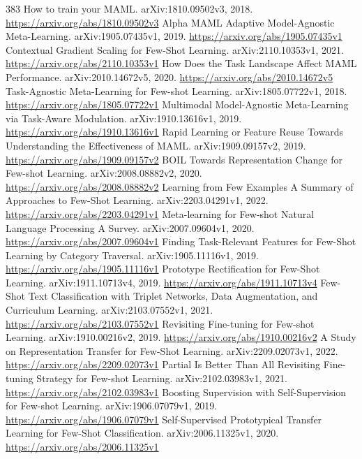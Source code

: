 \documentclass[11pt]{article}
\begin{document}
\begin{thebibliography}{383}
 How to train your MAML. arXiv:1810.09502v3, 2018. \url{https://arxiv.org/abs/1810.09502v3}
 Alpha MAML Adaptive Model-Agnostic Meta-Learning. arXiv:1905.07435v1, 2019. \url{https://arxiv.org/abs/1905.07435v1}
 Contextual Gradient Scaling for Few-Shot Learning. arXiv:2110.10353v1, 2021. \url{https://arxiv.org/abs/2110.10353v1}
 How Does the Task Landscape Affect MAML Performance. arXiv:2010.14672v5, 2020. \url{https://arxiv.org/abs/2010.14672v5}
 Task-Agnostic Meta-Learning for Few-shot Learning. arXiv:1805.07722v1, 2018. \url{https://arxiv.org/abs/1805.07722v1}
 Multimodal Model-Agnostic Meta-Learning via Task-Aware Modulation. arXiv:1910.13616v1, 2019. \url{https://arxiv.org/abs/1910.13616v1}
 Rapid Learning or Feature Reuse Towards Understanding the Effectiveness of MAML. arXiv:1909.09157v2, 2019. \url{https://arxiv.org/abs/1909.09157v2}
 BOIL Towards Representation Change for Few-shot Learning. arXiv:2008.08882v2, 2020. \url{https://arxiv.org/abs/2008.08882v2}
 Learning from Few Examples A Summary of Approaches to Few-Shot Learning. arXiv:2203.04291v1, 2022. \url{https://arxiv.org/abs/2203.04291v1}
 Meta-learning for Few-shot Natural Language Processing A Survey. arXiv:2007.09604v1, 2020. \url{https://arxiv.org/abs/2007.09604v1}
 Finding Task-Relevant Features for Few-Shot Learning by Category Traversal. arXiv:1905.11116v1, 2019. \url{https://arxiv.org/abs/1905.11116v1}
 Prototype Rectification for Few-Shot Learning. arXiv:1911.10713v4, 2019. \url{https://arxiv.org/abs/1911.10713v4}
 Few-Shot Text Classification with Triplet Networks, Data Augmentation, and Curriculum Learning. arXiv:2103.07552v1, 2021. \url{https://arxiv.org/abs/2103.07552v1}
 Revisiting Fine-tuning for Few-shot Learning. arXiv:1910.00216v2, 2019. \url{https://arxiv.org/abs/1910.00216v2}
 A Study on Representation Transfer for Few-Shot Learning. arXiv:2209.02073v1, 2022. \url{https://arxiv.org/abs/2209.02073v1}
 Partial Is Better Than All Revisiting Fine-tuning Strategy for Few-shot Learning. arXiv:2102.03983v1, 2021. \url{https://arxiv.org/abs/2102.03983v1}
 Boosting Supervision with Self-Supervision for Few-shot Learning. arXiv:1906.07079v1, 2019. \url{https://arxiv.org/abs/1906.07079v1}
 Self-Supervised Prototypical Transfer Learning for Few-Shot Classification. arXiv:2006.11325v1, 2020. \url{https://arxiv.org/abs/2006.11325v1}

\end{thebibliography}
\end{document}
